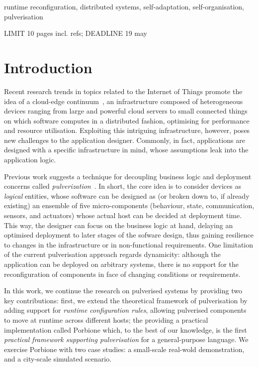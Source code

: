 \documentclass[conference]{IEEEtran}
\newcommand{\meta}[1]{{\color{blue}#1}}
\begin{document}
\begin{IEEEkeywords}
runtime reconfiguration, distributed systems, self-adaptation, self-organisation, pulverisation
\end{IEEEkeywords}

\newcommand{\ourframework}{Porbione}

\meta{LIMIT 10 pages incl. refs; DEADLINE 19 may}

\section{Introduction}\label{sec:introduction}

Recent research trends in topics related to the Internet of Things promote the idea of a cloud-edge continuum~\cite{DBLP:journals/iot/BittencourtISFM18},
an infrastructure composed of heterogeneous devices ranging from large and powerful cloud servers to small connected things
on which software computes in a distributed fashion,
optimising for performance and resource utilisation.
%
Exploiting this intriguing infrastructure, however, poses new challenges to the application designer.
%
Commonly, in fact, applications are designed with a specific infrastructure in mind,
whose assumptions leak into the application logic.

Previous work suggests a technique for decoupling business logic and deployment concerns
called \emph{pulverization}~\cite{FI2020-pulverization}.
%
In short, the core idea is to consider devices as \emph{logical} entities,
whose software can be designed as (or broken down to, if already existing) an ensemble of five micro-components
(behaviour, state, communication, sensors, and actuators)
whose actual host can be decided at deployment time.
%
This way, the designer can focus on the business logic at hand,
delaying an optimised deployment to later stages of the sofware design,
thus gaining resilience to changes in the infrastructure or in non-functional requirements.
%
One limitation of the current pulverisation approach regards dynamicity:
although the application can be deployed on arbitrary systems,
there is no support for the reconfiguration of components in face of changing conditions or requirements.

In this work,
we continue the research on pulverised systems by providing two key contributions:
first, we extend the theoretical framework of pulverisation by adding support for
\emph{runtime configuration rules}, allowing pulverised components to move at runtime across different hosts;
the providing a practical implementation called \ourframework{} which,
to the best of our knowledge,
is the first \emph{practical framework supporting pulverisation} for a general-purpose language.
%
We exercise \ourframework{} with two case studies:
a small-scale real-wold demonstration, and a city-scale simulated scenario.
\end{document}
